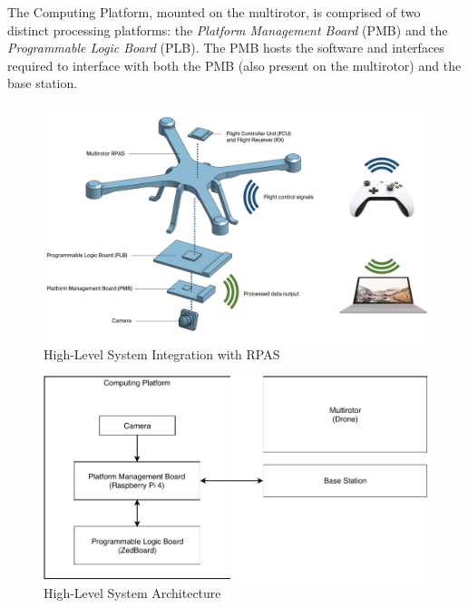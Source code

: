 The Computing Platform, mounted on the multirotor, is comprised of two distinct processing platforms: the \textit{Platform Management Board} (PMB) and the \textit{Programmable Logic Board} (PLB). The PMB hosts the software and interfaces required to interface with both the PMB (also present on the multirotor) and the base station.

\begin{figure}[H]\label{hlpic}
    \centering
    \includegraphics[width=\linewidth]{img/intpic.png}
\caption{High-Level System Integration with RPAS}
\end{figure}

\begin{figure}[H]\label{hldiag}
\centering
\includegraphics[width=15cm]{img/highlevel.pdf}
\caption{High-Level System Architecture}
\end{figure}

